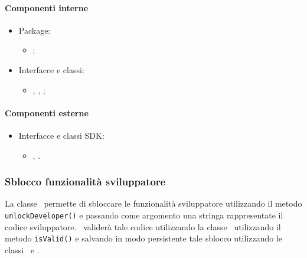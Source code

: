 \documentclass[../Funzionalita.tex]{subfiles}
\begin{document}
			\paragraph*{Componenti interne}
			\begin{itemize}
			
				\item Package:
				\begin{itemize}
					\item[] \usersetting;
				\end{itemize}
				
				\item Interfacce e classi:
				\begin{itemize}
					\item[] \Setting, \SettingImp, \PathPreference;
				\end{itemize}
				
			\end{itemize}
			
			
			\paragraph*{Componenti esterne}
			
			\begin{itemize}
				\item Interfacce e classi SDK:
				\begin{itemize}
					\item[] \SharedPreference, \SharedPreferenceEditor.
				\end{itemize}
			\end{itemize}
						
		
		\subsubsection{Sblocco funzionalità sviluppatore}
			La classe \SettingImp\ permette di sbloccare le funzionalità sviluppatore utilizzando il metodo \lstinline|unlockDeveloper()| e passando come argomento una stringa rappresentate il codice sviluppatore. \SettingImp\ validerà tale codice utilizzando la classe \DeveloperCodeManager\ utilizzando il metodo \lstinline|isValid()| e salvando in modo persistente tale sblocco utilizzando le classi \SharedPreference\ e \SharedPreferenceEditor.
		
\end{document}
